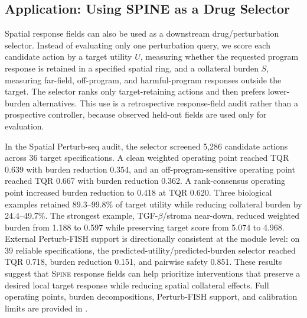 \documentclass[sigconf,review,balance=false]{acmart}
\newcommand{\methodname}{\textsc{Spine}\xspace}
\begin{document}
\subsection{Application: Using SPINE as a Drug Selector}
\label{sec:drug_selector_application}
Spatial response fields can also be used as a downstream drug/perturbation selector. Instead of evaluating only one perturbation query, we score each candidate action by a target utility \(U\), measuring whether the requested program response is retained in a specified spatial ring, and a collateral burden \(S\), measuring far-field, off-program, and harmful-program responses outside the target. The selector ranks only target-retaining actions and then prefers lower-burden alternatives. This use is a retrospective response-field audit rather than a prospective controller, because observed held-out fields are used only for evaluation.


In the Spatial Perturb-seq audit, the selector screened 5,286 candidate actions across 36 target specifications. A clean weighted operating point reached TQR 0.639 with burden reduction 0.354, and an off-program-sensitive operating point reached TQR 0.667 with burden reduction 0.362. A rank-consensus operating point increased burden reduction to 0.418 at TQR 0.620. Three biological examples retained 89.3--99.8\% of target utility while reducing collateral burden by 24.4--49.7\%. The strongest example, TGF-$\beta$/stroma near-down, reduced weighted burden from 1.188 to 0.597 while preserving target score from 5.074 to 4.968. External Perturb-FISH support is directionally consistent at the module level: on 39 reliable specifications, the predicted-utility/predicted-burden selector reached TQR 0.718, burden reduction 0.151, and pairwise safety 0.851. These results suggest that \methodname{} response fields can help prioritize interventions that preserve a desired local target response while reducing spatial collateral effects. Full operating points, burden decompositions, Perturb-FISH support, and calibration limits are provided in .
\FloatBarrier
\end{document}
